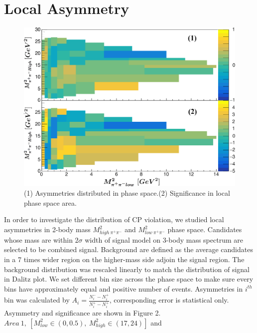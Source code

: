 \documentclass[12pt, twoside, notitlepage, twocolumn]{article}
\begin{document}
        \section{Local Asymmetry}
        \begin{figure}[b]
            \begin{centering}
            \includegraphics[scale=0.53]{LocalAS.png}
            \caption{(1) Asymmetries distributed in phase space.\newline (2) Significance in local phase space area.}
            \end{centering}
            \label{fig:label2}
        \end{figure}
        In order to investigate the distribution of CP violation, we studied local asymmetries in 
        2-body mass $M_{high\ \pi^+\pi^-}^2$ and $M_{low\ \pi^+\pi^-}^2$ phase space. Candidates whose
        mass are within $2\sigma$ width of signal model on 3-body mass spectrum are selected to be 
        combined signal. Background are defined as the average candidates in a 7 times wider region on 
        the higher-mass side adjoin the signal region. The background distribution was rescaled linearly 
        to match the distribution of signal in Dalitz plot. We set different bin size across the phase space
        to make sure every bins have approximately equal and positive number of events. Asymmetries in $i^{th}$ 
        bin was calculated by $A_i=\frac{N^-_i-N^+_i}{N^+_i-N^+_i}$, corresponding error is statistical only.
        Asymmetry and significance are shown in Figure 2.
        $Area\ 1,\ [M^2_{low} \in (0,0.5),\ M^2_{high}\in(17,24)]$ and 
\end{document}
